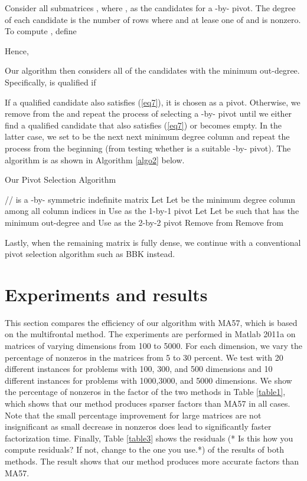 \documentclass{article}
\begin{document}
Consider all submatrices , where , as the candidates for a -by- pivot.  The degree of each candidate  is the number of rows  where  and at lease one of  and  is nonzero.  To compute , define

Hence,

Our algorithm then considers all of the candidates with the minimum out-degree.  Specifically, 
 is qualified if

If a qualified candidate also satisfies (\ref{eq7}), it is chosen as a pivot.  Otherwise, we remove  from the  and repeat the process of selecting a -by- pivot until we either find a qualified candidate that also satisfies (\ref{eq7}) or  becomes empty.  In the latter case, we set  to be the next next minimum degree column and repeat the process from the beginning (from testing whether  is a suitable -by- pivot).  
The algorithm is as shown in Algorithm \ref{algo2} below.

\begin{algorithm}
\caption{Our Pivot Selection Algorithm}\label{algo2}
\begin{algorithmic}
\STATE //  is a -by- symmetric indefinite matrix
\STATE Let 
\STATE Let  be the minimum degree column among all column indices in 
   \STATE Use  as the 1-by-1 pivot
\ELSE
   \STATE Let  
      \STATE Let  be such that  has the minimum out-degree and 
         \STATE Use  as the 2-by-2 pivot
      \ELSE
         \STATE Remove  from  
      \ENDIF
   \ENDWHILE
   \STATE Remove  from 
\ENDIF
\ENDWHILE
\end{algorithmic}
\end{algorithm}
Lastly, when the remaining matrix is fully dense, we continue with a conventional pivot selection algorithm such as BBK instead.




\section{Experiments and results} \label{sec5}

This section compares the efficiency of our algorithm with MA57, which is based on the multifrontal method. 
The experiments are performed in Matlab 2011a on matrices of varying dimensions from 100 to 5000.
For each dimension, we vary the percentage of nonzeros in the matrices from 5 to 30 percent.
We test with 20 different instances for problems with 100, 300, and 500 dimensions and 10 different instances for problems with 1000,3000, and 5000 dimensions.  We show the percentage of nonzeros in the factor  of the two methods in Table \ref{table1}, which shows that our method produces sparser factors than MA57 in all cases.  Note that the small percentage improvement for large matrices are not insignificant as small decrease in nonzeros does lead to significantly faster factorization time.  Finally, Table \ref{table3} shows the residuals  (* Is this how you compute residuals?  If not, change to the one you use.*) of the results of both methods. The result shows that our method produces more accurate factors than MA57.
\end{document}
